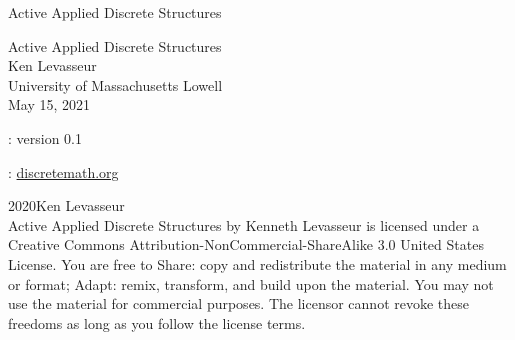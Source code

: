 \documentclass[oneside,10pt,]{book}
\newcommand{\titlepagefont}{\relax}
\numberwithin{equation}{section}
\begin{document}
\frontmatter
\thispagestyle{empty}
{\titlepagefont\centering
\vspace*{0.28\textheight}
{\Huge Active Applied Discrete Structures}\\}
\clearpage
\thispagestyle{empty}
{\titlepagefont\centering
\vspace*{0.14\textheight}
{\Huge Active Applied Discrete Structures}\\[3\baselineskip]
{\Large Ken Levasseur}\\[0.5\baselineskip]
{\Large University of Massachusetts Lowell}\\[3\baselineskip]
{\Large May 15, 2021}\\}
\clearpage
\thispagestyle{empty}
\hypertarget{g:colophon:idm218170784816}{}
: version 0.1\par\medskip
{}: \href{http:\slash{}\slash{}discretemath.org}{discretemath.org}\par\medskip
\noindent\textcopyright{}2020\quad{}Ken Levasseur\\[0.5\baselineskip]
Active Applied Discrete Structures by Kenneth Levasseur is licensed under a Creative Commons Attribution-NonCommercial-ShareAlike 3.0 United States License. You are free to Share: copy and redistribute the material in any medium or format; Adapt: remix, transform, and build upon the material. You may not use the material for commercial purposes.  The licensor cannot revoke these freedoms as long as you follow the license terms.\par\medskip
{}
\null\clearpage
%
%
\typeout{************************************************}
\typeout{************************************************}
%
\end{document}
